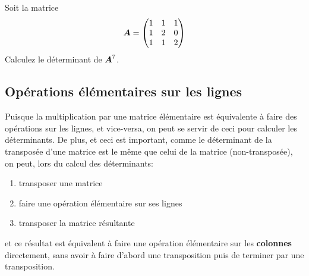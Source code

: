 \begin{exerciceC}
Soit la matrice \[
\boldsymbol{A} = \begin{pmatrix}
1 & 1 & 1 \\
1 & 2 & 0 \\
1 & 1 & 2
\end{pmatrix}
\]
Calculez le déterminant de $\boldsymbol{A}^7$.
\end{exerciceC}


\subsection{Opérations élémentaires sur les lignes}
Puisque la multiplication par une matrice élémentaire est équivalente à faire des opérations sur les lignes, et vice-versa, on peut se servir de ceci pour calculer les déterminants.  De plus, et ceci est important, comme le déterminant de la transposée d'une matrice est le même que celui de la matrice (non-transposée), on peut,
lors du calcul des déterminants:
\begin{enumerate}
\item transposer une matrice
\item faire une opération élémentaire sur ses lignes
\item transposer la matrice résultante
\end{enumerate}
et ce résultat est équivalent à faire une opération élémentaire sur les \textbf{colonnes} directement, sans
avoir à faire d'abord une transposition puis de terminer par une transposition.

